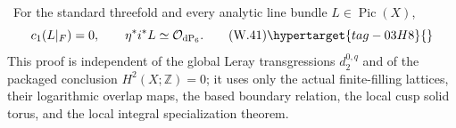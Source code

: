 \begin{proposition}
\hypertarget{tag-03IL}{}\label{wbII:prop:direct-boundary-picard}

\ For the standard threefold and every analytic line bundle
$L\in\operatorname{Pic}(X)$,
\[
 c_1(L|_F)=0,
 \qquad
 \eta^*i^*L\simeq\mathcal O_{\mathrm{dP}_6}.
\tag{W.41}\hypertarget{tag-03H8}{}\label{wbII:eq:W:5.17q}
\]
This proof is independent of the global Leray transgressions
$d_2^{0,q}$ and of the packaged conclusion $H^2(X;\mathbb Z)=0$; it uses
only the actual finite-filling lattices, their logarithmic overlap maps, the
based boundary relation, the local cusp solid torus, and the local integral
specialization theorem.
\end{proposition}



